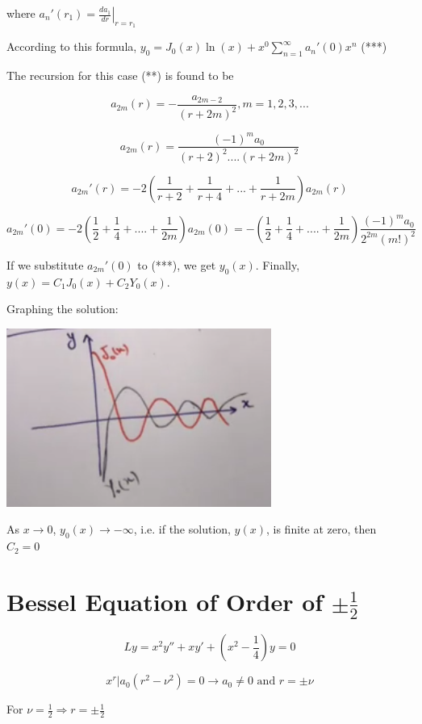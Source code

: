\documentclass{article}
\begin{document}
where $a_n ' (r_1) = \left. \frac{d a_1}{dr} \right|_{r = r_1}$

According to this formula, $y_0 = J_0 (x) \ln(x) + x^{0} \sum_{n = 1}^\infty a_n' (0) x^n$ (***)

The recursion for this case (**) is found to be 

$$a_{2m} (r) = - \frac{a_{2m-2}}{(r + 2m)^2}, m = 1,2,3,...$$

$$a_{2m}(r) = \frac{(-1)^m a_0}{(r+2)^2 .... (r + 2m)^2}$$

$$a_{2m}' (r) = -2 \left( \frac{1}{r+2} + \frac{1}{r+4} + ... + \frac{1}{r + 2m} \right) a_{2m} (r)$$

$$a_{2m}' (0) = -2 \left( \frac{1}{2} + \frac{1}{4} + .... + \frac{1}{2m} \right) a_{2m}(0) = - \left(\frac{1}{2} + \frac{1}{4} + .... + \frac{1}{2m} \right) \frac{(-1)^m a_0}{2^{2m} (m!)^2} $$


If we substitute $a_{2m}'(0)$ to (***), we get $y_0 (x)$. Finally, $y(x) = C_1 J_0 (x) + C_2 Y_0 (x)$. 

Graphing the solution:

\includegraphics[width = 0.8 \textwidth]{image4.png}

As $x \to 0$, $y_0 (x) \to - \infty$, i.e. if the solution, $y(x)$, is finite at zero, then $C_2 = 0$

\section{Bessel Equation of Order of $\pm \frac{1}{2}$}

$$Ly = x^2 y'' + xy' + (x^2 - \frac{1}{4} )y = 0$$

$$x^r | a_0 (r^2 - \nu^2) = 0 \longrightarrow a_0 \neq 0 \text{ and } r = \pm \nu$$

For $\nu = \frac{1}{2} \Rightarrow r = \pm \frac{1}{2}$
\end{document}
